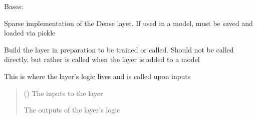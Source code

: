 \documentclass[letterpaper,10pt,english]{sphinxmanual}
\begin{document}
\begin{fulllineitems}
\label{\detokenize{beyondml.tflow.layers:beyondml.tflow.layers.SparseDense.SparseDense}}
\pysigstartsignatures
{}
\pysigstopsignatures
\sphinxAtStartPar
Bases: 

\sphinxAtStartPar
Sparse implementation of the Dense layer. If used in a model, must be saved and loaded via pickle

\begin{fulllineitems}
\label{\detokenize{beyondml.tflow.layers:beyondml.tflow.layers.SparseDense.SparseDense.build}}
\pysigstartsignatures
{}
\pysigstopsignatures
\sphinxAtStartPar
Build the layer in preparation to be trained or called. Should not be called directly,
but rather is called when the layer is added to a model

\end{fulllineitems}


\begin{fulllineitems}
\label{\detokenize{beyondml.tflow.layers:beyondml.tflow.layers.SparseDense.SparseDense.call}}
\pysigstartsignatures
{}
\pysigstopsignatures
\sphinxAtStartPar
This is where the layer’s logic lives and is called upon inputs
\begin{quote}\begin{description}
\sphinxAtStartPar
{} () \textendash{} The inputs to the layer

\sphinxAtStartPar
{} \textendash{} The outputs of the layer’s logic


\end{description}
\end{quote}
\end{fulllineitems}
\end{fulllineitems}
\end{document}
